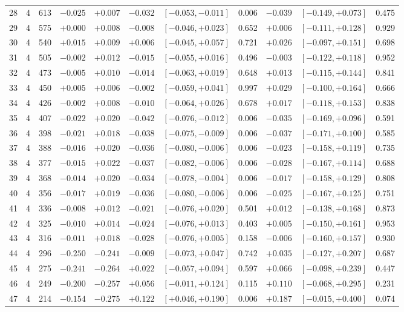 \documentclass[11pt]{article}
\begin{document}
\begin{table}[p]
\begin{tabular}{@{}rrr rr rcc rcc@{}}
28 & 4 & 613 & $-0.025$ & $+0.007$ & $-0.032$ & $[-0.053,-0.011]$ & 0.006 & $-0.039$ & $[-0.149,+0.073]$ & 0.475 \\
29 & 4 & 575 & $+0.000$ & $+0.008$ & $-0.008$ & $[-0.046,+0.023]$ & 0.652 & $+0.006$ & $[-0.111,+0.128]$ & 0.929 \\
30 & 4 & 540 & $+0.015$ & $+0.009$ & $+0.006$ & $[-0.045,+0.057]$ & 0.721 & $+0.026$ & $[-0.097,+0.151]$ & 0.698 \\
31 & 4 & 505 & $-0.002$ & $+0.012$ & $-0.015$ & $[-0.055,+0.016]$ & 0.496 & $-0.003$ & $[-0.122,+0.118]$ & 0.952 \\
32 & 4 & 473 & $-0.005$ & $+0.010$ & $-0.014$ & $[-0.063,+0.019]$ & 0.648 & $+0.013$ & $[-0.115,+0.144]$ & 0.841 \\
33 & 4 & 450 & $+0.005$ & $+0.006$ & $-0.002$ & $[-0.059,+0.041]$ & 0.997 & $+0.029$ & $[-0.100,+0.164]$ & 0.666 \\
34 & 4 & 426 & $-0.002$ & $+0.008$ & $-0.010$ & $[-0.064,+0.026]$ & 0.678 & $+0.017$ & $[-0.118,+0.153]$ & 0.838 \\
35 & 4 & 407 & $-0.022$ & $+0.020$ & $-0.042$ & $[-0.076,-0.012]$ & 0.006 & $-0.035$ & $[-0.169,+0.096]$ & 0.591 \\
36 & 4 & 398 & $-0.021$ & $+0.018$ & $-0.038$ & $[-0.075,-0.009]$ & 0.006 & $-0.037$ & $[-0.171,+0.100]$ & 0.585 \\
37 & 4 & 388 & $-0.016$ & $+0.020$ & $-0.036$ & $[-0.080,-0.006]$ & 0.006 & $-0.023$ & $[-0.158,+0.119]$ & 0.735 \\
38 & 4 & 377 & $-0.015$ & $+0.022$ & $-0.037$ & $[-0.082,-0.006]$ & 0.006 & $-0.028$ & $[-0.167,+0.114]$ & 0.688 \\
39 & 4 & 368 & $-0.014$ & $+0.020$ & $-0.034$ & $[-0.078,-0.004]$ & 0.006 & $-0.017$ & $[-0.158,+0.129]$ & 0.808 \\
40 & 4 & 356 & $-0.017$ & $+0.019$ & $-0.036$ & $[-0.080,-0.006]$ & 0.006 & $-0.025$ & $[-0.167,+0.125]$ & 0.751 \\
41 & 4 & 336 & $-0.008$ & $+0.012$ & $-0.021$ & $[-0.076,+0.020]$ & 0.501 & $+0.012$ & $[-0.138,+0.168]$ & 0.873 \\
42 & 4 & 325 & $-0.010$ & $+0.014$ & $-0.024$ & $[-0.076,+0.013]$ & 0.403 & $+0.005$ & $[-0.150,+0.161]$ & 0.953 \\
43 & 4 & 316 & $-0.011$ & $+0.018$ & $-0.028$ & $[-0.076,+0.005]$ & 0.158 & $-0.006$ & $[-0.160,+0.157]$ & 0.930 \\
44 & 4 & 296 & $-0.250$ & $-0.241$ & $-0.009$ & $[-0.073,+0.047]$ & 0.742 & $+0.035$ & $[-0.127,+0.207]$ & 0.687 \\
45 & 4 & 275 & $-0.241$ & $-0.264$ & $+0.022$ & $[-0.057,+0.094]$ & 0.597 & $+0.066$ & $[-0.098,+0.239]$ & 0.447 \\
46 & 4 & 249 & $-0.200$ & $-0.257$ & $+0.056$ & $[-0.011,+0.124]$ & 0.115 & $+0.110$ & $[-0.068,+0.295]$ & 0.231 \\
47 & 4 & 214 & $-0.154$ & $-0.275$ & $+0.122$ & $[+0.046,+0.190]$ & 0.006 & $+0.187$ & $[-0.015,+0.400]$ & 0.074 \\
\bottomrule
\end{tabular}
\end{table}
\end{document}
